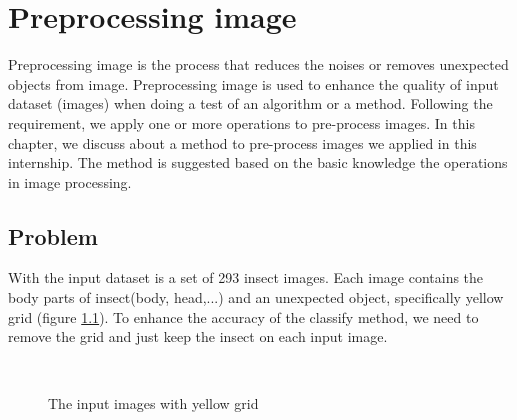 \chapter{Preprocessing image}
Preprocessing image is the process that reduces the noises or removes unexpected objects from image. Preprocessing image is used to enhance the quality of input dataset (images) when doing a test of an algorithm or a method. Following the requirement, we apply one or more operations to pre-process images. In this chapter, we discuss about a method to pre-process images we applied in this internship. The method is suggested based on the basic knowledge the operations in image processing.
\section{Problem}
With the input dataset is a set of 293 insect images. Each image contains the body parts of insect(body, head,...) and an unexpected object, specifically yellow grid (figure \ref{fig:figure_31}). To enhance the accuracy of the classify method, we need to remove the grid and just keep the insect on each input image.
\begin{figure}[h!]
\centering
{}~~
\caption{The input images with yellow grid}
\label{fig:figure_31}
\end{figure}
